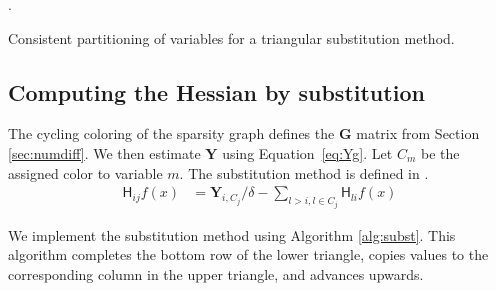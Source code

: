 \documentclass[jss]{jss}\usepackage[]{graphicx}\usepackage[]{color}
\newcommand{\hess}[2]{\mathsf{H}_{#1}#2}
\newcommand{\Mat}[1]{\mathbf{#1}}
\begin{document}
\begin{algorithm}
  \begin{algorithmic}
    .
     
        \ELSE
        \ELSE
             \ENDIF
    \ENDIF
    \ENDFOR
    \ENDFOR
    \end{algorithmic}
    \caption{Consistent partitioning of variables for a triangular
      substitution method.}\label{alg:coloring}
    \end{algorithm}


\subsection[Computing the Hessian by substitution]{Computing the Hessian by substitution}

The cycling coloring of the sparsity graph defines the $\Mat{G}$
matrix from Section \ref{sec:numdiff}.  We then estimate $\Mat{Y}$
using Equation~\ref{eq:Yg}.   Let $C_m$ be the assigned color to
variable $m$.  The substitution method is defined in
\citet[Equation 6.1]{ColemanMore1984}.
\begin{align}
  \label{eq:subst}
  \hess{ij}{f(x)}&=\Mat{Y}_{i,C_j}/\delta - \sum_{l>i,l\in C_j}\hess{li}{f(x)}
\end{align}

We implement the substitution method using Algorithm \ref{alg:subst}.
This algorithm completes the bottom row of the lower triangle, copies
values to the corresponding column in the upper triangle, and advances upwards.
\end{document}
